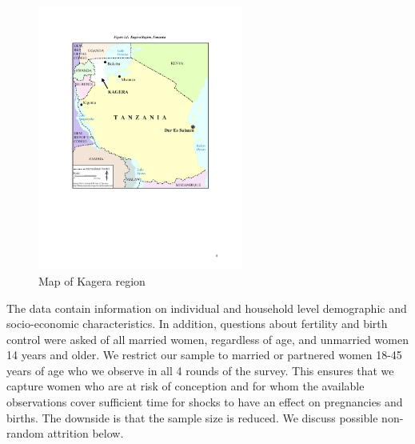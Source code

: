 \documentclass[letterpaper,12pt]{article}
\begin{document}
\begin{figure}[ht] 
 \centering
 \includegraphics[width=0.6\textwidth]{../staticPDF/kagera.pdf}
 \caption{Map of Kagera region}
  \label{fig:kagera_map}
\end{figure}


The data contain information on individual and household level demographic 
and socio-economic characteristics. 
In addition, questions about fertility and birth control were asked of all 
married women, regardless of age, and unmarried women 14 years and older. 
We restrict our sample to married or partnered women 18-45 years of age who we 
observe in all 4 rounds of the survey.
This ensures that we capture women who are at risk of conception and for whom 
the available observations cover sufficient time for shocks to have an effect
on pregnancies and births.
The downside is that the sample size is reduced.
We discuss possible non-random attrition below.


\end{document}
